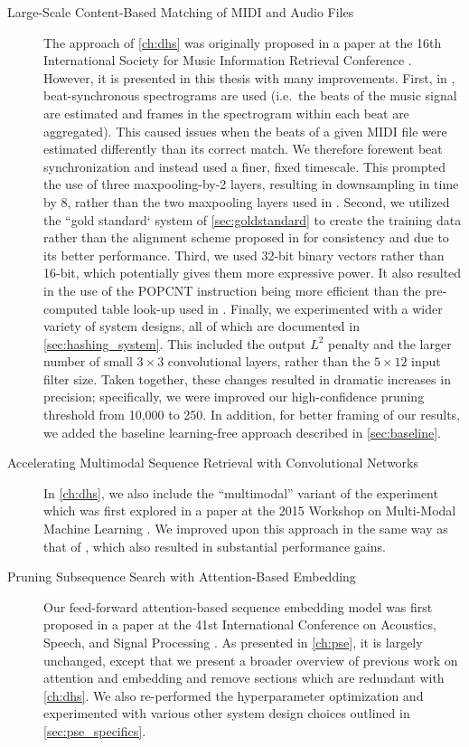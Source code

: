 \begin{description}
\item[Large-Scale Content-Based Matching of MIDI and Audio Files]$\;$\\ The approach of \cref{ch:dhs} was originally proposed in a paper at the 16th International Society for Music Information Retrieval Conference \cite{raffel2015large}.
However, it is presented in this thesis with many improvements.
First, in \cite{raffel2015large}, beat-synchronous spectrograms are used (i.e.\ the beats of the music signal are estimated and frames in the spectrogram within each beat are aggregated).
This caused issues when the beats of a given MIDI file were estimated differently than its correct match.
We therefore forewent beat synchronization and instead used a finer, fixed timescale.
This prompted the use of three maxpooling-by-2 layers, resulting in downsampling in time by 8, rather than the two maxpooling layers used in \cite{raffel2015large}.
Second, we utilized the ``gold standard` system of \cref{sec:goldstandard} to create the training data rather than the alignment scheme proposed in \cite{raffel2015large} for consistency and due to its better performance.
Third, we used 32-bit binary vectors rather than 16-bit, which potentially gives them more expressive power.
It also resulted in the use of the POPCNT instruction being more efficient than the pre-computed table look-up used in \cite{raffel2015large}.
Finally, we experimented with a wider variety of system designs, all of which are documented in \cref{sec:hashing_system}.
This included the output $L^2$ penalty and the larger number of small $3 \times 3$ convolutional layers, rather than the $5 \times 12$ input filter size.
Taken together, these changes resulted in dramatic increases in precision; specifically, we were improved our high-confidence pruning threshold from 10,000 to 250.
In addition, for better framing of our results, we added the baseline learning-free approach described in \cref{sec:baseline}.

\item[Accelerating Multimodal Sequence Retrieval with Convolutional Networks]$\;$\\ In \cref{ch:dhs}, we also include the ``multimodal'' variant of the experiment which was first explored in a paper at the 2015 Workshop on Multi-Modal Machine Learning \cite{raffel2015accelerating}.
We improved upon this approach in the same way as that of \cite{raffel2015large}, which also resulted in substantial performance gains.

\item[Pruning Subsequence Search with Attention-Based Embedding]$\;$\\ Our feed-forward attention-based sequence embedding model was first proposed in a paper at the 41st International Conference on Acoustics, Speech, and Signal Processing \cite{raffel2016pruning}.
As presented in \cref{ch:pse}, it is largely unchanged, except that we present a broader overview of previous work on attention and embedding and remove sections which are redundant with \cref{ch:dhs}.
We also re-performed the hyperparameter optimization and experimented with various other system design choices outlined in \cref{sec:pse_specifics}.
\end{description}
